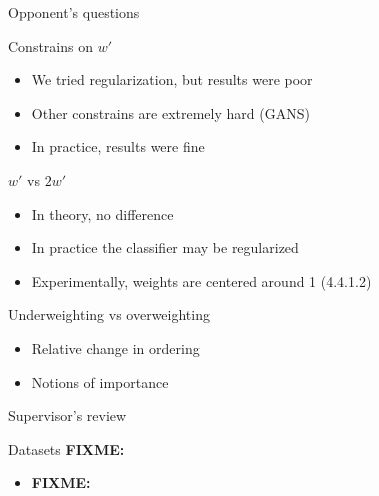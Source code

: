 \documentclass[xcolor={table}]{beamer}
\def\*{{\bf FIXME: }}
\begin{document}
\begin{frame}{Opponent's questions}
    \small
    \begin{block}{Constrains on $w'$}
        \begin{itemize}
            \itemsep0em
            \item We tried regularization, but results were poor
            \item Other constrains are extremely hard (GANS)
            \item In practice, results were fine
        \end{itemize}
    \end{block}
    
    \begin{block}{$w'$ vs $2w'$}
        \begin{itemize}
            \itemsep0em
            \item In theory, no difference %
            \item In practice the classifier may be regularized
            \item Experimentally, weights are centered around 1 (4.4.1.2)
        \end{itemize}
    \end{block}
    
    \begin{block}{Underweighting vs overweighting}
        \begin{itemize}
            \itemsep0em
            \item Relative change in ordering %
            \item Notions of importance %
        \end{itemize}
    \end{block}
\end{frame}

\begin{frame}{Supervisor's review}
    \begin{block}{Datasets \*}
        \begin{itemize}
            \item \*
        \end{itemize}
    \end{block}
\end{frame}
\end{document}
